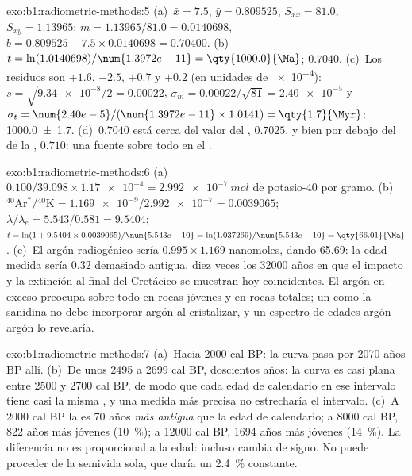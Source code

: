 \begin{solution}{exo:b1:radiometric-methods:5}
(a)~$\bar x = 7.5$, $\bar y = 0.809525$, $S_{xx} = 81.0$, $S_{xy} = 1.13965$;
$m = 1.13965/81.0 = 0.0140698$, $b = 0.809525 - 7.5 \times 0.0140698 = 0.70400$.
(b)~$t = \ln(1.0140698)/\num{1.3972e-11} = \qty{1000.0}{\Ma}$; 
$0.7040$. (c)~Los residuos son $+1.6$, $-2.5$, $+0.7$ y $+0.2$ (en unidades de
\num{e-4}): $s = \sqrt{\num{9.34e-8}/2} = 0.00022$, $\sigma_m = 0.00022/\sqrt{81}
= \num{2.40e-5}$ y $\sigma_t = \num{2.40e-5}/(\num{1.3972e-11} \times 1.0141) =
\qty{1.7}{\Myr}$: \qty[uncertainty-mode=separate]{1000.0(17)}{\Ma}. (d)~$0.7040$
está cerca del valor del , $0.7025$, y bien por debajo del de la , $0.710$: una fuente sobre todo en el .
\end{solution}

\begin{solution}{exo:b1:radiometric-methods:6}
(a)~$0.100/39.098 \times \num{1.17e-4} = \qty{2.992e-7}{mol}$ de potasio-40 por
gramo. (b)~${}^{40}\mathrm{Ar}^*/{}^{40}\mathrm{K} = \num{1.169e-9}/\num{2.992e-7}
= 0.0039065$; $\lambda/\lambda_e = 5.543/0.581 = 9.5404$; $t = \ln(1 + 9.5404
\times 0.0039065)/\num{5.543e-10} = \ln(1.037269)/\num{5.543e-10} =
\qty{66.01}{\Ma}$. (c)~El argón radiogénico sería $0.995 \times 1.169$
nanomoles, dando \qty{65.69}{\Ma}: la edad medida sería \qty{0.32}{\Myr}
demasiado antigua, diez veces los \num{32000} años en que el impacto y la
extinción al final del Cretácico se muestran hoy coincidentes. El argón en exceso preocupa sobre todo en rocas jóvenes y en rocas totales; un
 como la sanidina no debe incorporar argón al cristalizar, y un espectro de edades argón--argón lo revelaría.
\end{solution}

\begin{solution}{exo:b1:radiometric-methods:7}
(a)~Hacia \num{2000} cal BP: la curva pasa por \num{2070} años BP allí.
(b)~De unos \num{2495} a \num{2699} cal BP, doscientos años: la curva es
casi plana entre \num{2500} y \num{2700} cal BP, de modo que cada edad de calendario
en ese intervalo tiene casi la misma , y una medida más precisa no estrecharía el intervalo. (c)~A \num{2000} cal BP la  es \num{70} años \emph{más antigua} que la edad de calendario; a \num{8000} cal BP,
\num{822} años más jóvenes (\qty{10}{\percent}); a \num{12000} cal BP, \num{1694}
años más jóvenes (\qty{14}{\percent}). La diferencia no es proporcional a la
edad: incluso cambia de signo. No puede proceder de la semivida sola, que daría un \qty{2.4}{\percent} constante.
\end{solution}

